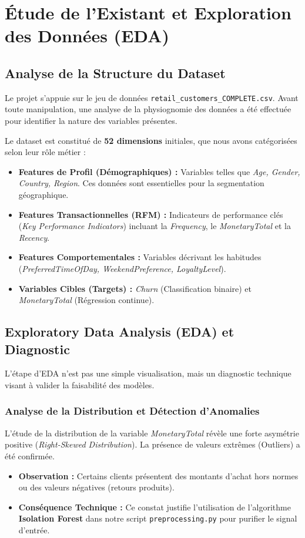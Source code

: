 \documentclass[11pt,a4paper]{article}
\begin{document}
\section{Étude de l'Existant et Exploration des Données (EDA)}

\subsection{Analyse de la Structure du Dataset}
Le projet s'appuie sur le jeu de données \texttt{retail\_customers\_COMPLETE.csv}. Avant toute manipulation, une analyse de la physiognomie des données a été effectuée pour identifier la nature des variables présentes. 

Le dataset est constitué de \textbf{52 dimensions} initiales, que nous avons catégorisées selon leur rôle métier :
\begin{itemize}
    \item \textbf{Features de Profil (Démographiques) :} Variables telles que \textit{Age, Gender, Country, Region}. Ces données sont essentielles pour la segmentation géographique.
    \item \textbf{Features Transactionnelles (RFM) :} Indicateurs de performance clés (\textit{Key Performance Indicators}) incluant la \textit{Frequency}, le \textit{MonetaryTotal} et la \textit{Recency}.
    \item \textbf{Features Comportementales :} Variables décrivant les habitudes (\textit{PreferredTimeOfDay, WeekendPreference, LoyaltyLevel}).
    \item \textbf{Variables Cibles (Targets) :} \textit{Churn} (Classification binaire) et \textit{MonetaryTotal} (Régression continue).
\end{itemize}

\subsection{Exploratory Data Analysis (EDA) et Diagnostic}
L'étape d'EDA n'est pas une simple visualisation, mais un diagnostic technique visant à valider la faisabilité des modèles.

\subsubsection{Analyse de la Distribution et Détection d'Anomalies}
L'étude de la distribution de la variable \textit{MonetaryTotal} révèle une forte asymétrie positive (\textit{Right-Skewed Distribution}). La présence de valeurs extrêmes (Outliers) a été confirmée.
\begin{itemize}
    \item \textbf{Observation :} Certains clients présentent des montants d'achat hors normes ou des valeurs négatives (retours produits).
    \item \textbf{Conséquence Technique :} Ce constat justifie l'utilisation de l'algorithme \textbf{Isolation Forest} dans notre script \texttt{preprocessing.py} pour purifier le signal d'entrée.
\end{itemize}
\end{document}
